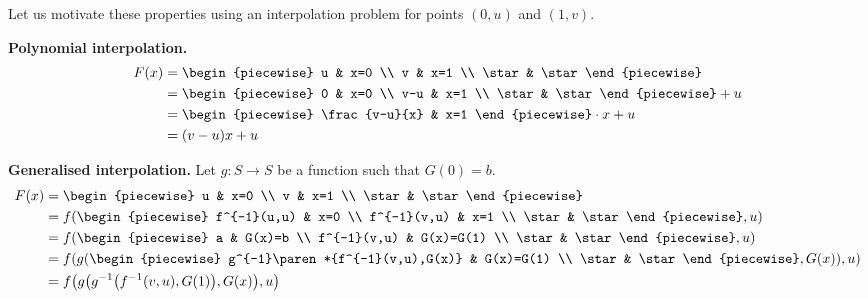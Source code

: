 \begin{example}
    Let us motivate these properties using an interpolation problem for points $(0,u)$ and $(1,v)$.

    \par\textbf{Polynomial interpolation.}
    \begin{align*}
        F(x) &= \begin{piecewise}
            u & x=0 \\
            v & x=1 \\
            \star & \star
        \end{piecewise} \\
        &= \begin{piecewise}
            0 & x=0 \\
            v-u & x=1 \\
            \star & \star
        \end{piecewise}+u \\
        &= \begin{piecewise}
            \frac{v-u}{x} & x=1
        \end{piecewise}\cdot x+u \\
        &= (v-u)x+u
    \end{align*}

    \par\textbf{Generalised interpolation.}
    Let $g:S\to S$ be a function such that $G(0)=b$.
    \begin{align*}
        F(x) &= \begin{piecewise}
            u & x=0 \\
            v & x=1 \\
            \star & \star
        \end{piecewise} \\
        &= f\paren*{\begin{piecewise}
            f^{-1}(u,u) & x=0 \\
            f^{-1}(v,u) & x=1 \\
            \star & \star
        \end{piecewise},u} \\
        &= f\paren*{\begin{piecewise}
            a & G(x)=b \\
            f^{-1}(v,u) & G(x)=G(1) \\
            \star & \star
        \end{piecewise},u} \\
        &= f\paren*{g\paren*{\begin{piecewise}
            g^{-1}\paren*{f^{-1}(v,u),G(x)} & G(x)=G(1) \\
            \star & \star
        \end{piecewise},G(x)},u} \\
        &= f\paren*{g\paren*{g^{-1}\paren*{f^{-1}(v,u),G(1)},G(x)},u}
    \end{align*}
\end{example}

